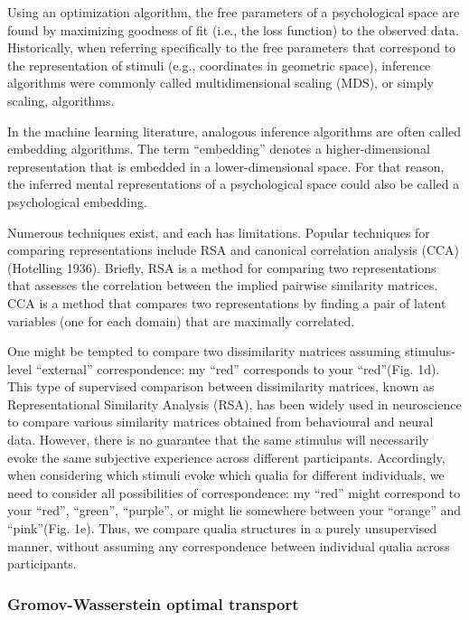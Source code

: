 \documentclass[
  authoryear]{elsarticle}
\begin{document}
Using an optimization algorithm, the free parameters of a psychological
space are found by maximizing goodness of fit (i.e., the loss function)
to the observed data. Historically, when referring specifically to the
free parameters that correspond to the representation of stimuli (e.g.,
coordinates in geometric space), inference algorithms were commonly
called multidimensional scaling (MDS), or simply scaling, algorithms.

In the machine learning literature, analogous inference algorithms are
often called embedding algorithms. The term ``embedding'' denotes a
higher-dimensional representation that is embedded in a
lower-dimensional space. For that reason, the inferred mental
representations of a psychological space could also be called a
psychological embedding.

Numerous techniques exist, and each has limitations. Popular techniques
for comparing representations include RSA \citet{kriegeskorte2008} and
canonical correlation analysis (CCA) (Hotelling 1936). Briefly, RSA is a
method for comparing two representations that assesses the correlation
between the implied pairwise similarity matrices. CCA is a method that
compares two representations by finding a pair of latent variables (one
for each domain) that are maximally correlated.

One might be tempted to compare two dissimilarity matrices assuming
stimulus-level ``external'' correspondence: my ``red'' corresponds to
your ``red''(Fig. 1d). This type of supervised comparison between
dissimilarity matrices, known as Representational Similarity Analysis
(RSA), has been widely used in neuroscience to compare various
similarity matrices obtained from behavioural and neural data. However,
there is no guarantee that the same stimulus will necessarily evoke the
same subjective experience across different participants. Accordingly,
when considering which stimuli evoke which qualia for different
individuals, we need to consider all possibilities of correspondence: my
``red'' might correspond to your ``red'', ``green'', ``purple'', or
might lie somewhere between your ``orange'' and ``pink''(Fig. 1e). Thus,
we compare qualia structures in a purely unsupervised manner, without
assuming any correspondence between individual qualia across
participants.

\subsubsection{Gromov-Wasserstein optimal
transport}\label{gromov-wasserstein-optimal-transport}
\end{document}
